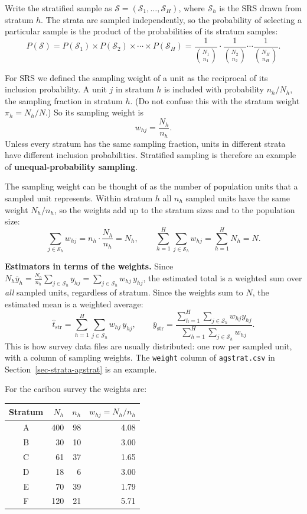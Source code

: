 \documentclass[
  letterpaper,
  DIV=11,
  numbers=noendperiod]{scrreprt}
\newcounter{none} %
\renewcommand{\[}{\begin{equation}}
\renewcommand{\]}{\end{equation}}
\begin{document}
Write the stratified sample as
\(\mathcal S = (\mathcal S_1,\ldots,\mathcal S_H)\), where
\(\mathcal S_h\) is the SRS drawn from stratum \(h\). The strata are
sampled independently, so the probability of selecting a particular
sample is the product of the probabilities of its stratum samples: \[
P(\mathcal S) = P(\mathcal S_1)\times P(\mathcal S_2)\times\cdots\times P(\mathcal S_H)
 = \frac{1}{\binom{N_1}{n_1}}\cdot\frac{1}{\binom{N_2}{n_2}}\cdots\frac{1}{\binom{N_H}{n_H}}.
\]

For SRS we defined the sampling weight of a unit as the reciprocal of
its inclusion probability. A unit \(j\) in stratum \(h\) is included
with probability \(n_h/N_h\), the sampling fraction in stratum \(h\).
(Do not confuse this with the stratum weight \(\pi_h = N_h/N\).) So its
sampling weight is \[
w_{hj} = \frac{N_h}{n_h}.
\] Unless every stratum has the same sampling fraction, units in
different strata have different inclusion probabilities. Stratified
sampling is therefore an example of \textbf{unequal-probability
sampling}.

The sampling weight can be thought of as the number of population units
that a sampled unit represents. Within stratum \(h\) all \(n_h\) sampled
units have the same weight \(N_h/n_h\), so the weights add up to the
stratum sizes and to the population size: \[
\sum_{j\in\mathcal S_h} w_{hj} = n_h\cdot\frac{N_h}{n_h} = N_h,
\qquad
\sum_{h=1}^H\sum_{j\in\mathcal S_h} w_{hj} = \sum_{h=1}^H N_h = N.
\]

\textbf{Estimators in terms of the weights.} Since
\(N_h\overline y_h = \frac{N_h}{n_h}\sum_{j\in\mathcal S_h} y_{hj} = \sum_{j\in\mathcal S_h} w_{hj}\,y_{hj}\),
the estimated total is a weighted sum over \emph{all} sampled units,
regardless of stratum. Since the weights sum to \(N\), the estimated
mean is a weighted average: \[
\hat t_{\text{str}} = \sum_{h=1}^H \sum_{j\in\mathcal S_h} w_{hj}\, y_{hj},
\qquad
\overline y_{\text{str}} = \frac{\sum_{h=1}^H\sum_{j\in\mathcal S_h} w_{hj}y_{hj}}{\sum_{h=1}^H\sum_{j\in\mathcal S_h} w_{hj}}.
\] This is how survey data files are usually distributed: one row per
sampled unit, with a column of sampling weights. The \texttt{weight}
column of \texttt{agstrat.csv} in Section~\ref{sec-strata-agstrat} is an
example.

For the caribou survey the weights are:

{\def\LTcaptype{none} %
\begin{longtable}[]{@{}crrr@{}}
\toprule\noalign{}
Stratum & \(N_h\) & \(n_h\) & \(w_{hj} = N_h/n_h\) \\
\midrule\noalign{}
\endhead
\bottomrule\noalign{}
\endlastfoot
A & 400 & 98 & 4.08 \\
B & 30 & 10 & 3.00 \\
C & 61 & 37 & 1.65 \\
D & 18 & 6 & 3.00 \\
E & 70 & 39 & 1.79 \\
F & 120 & 21 & 5.71 \\
\end{longtable}
}
\end{document}
